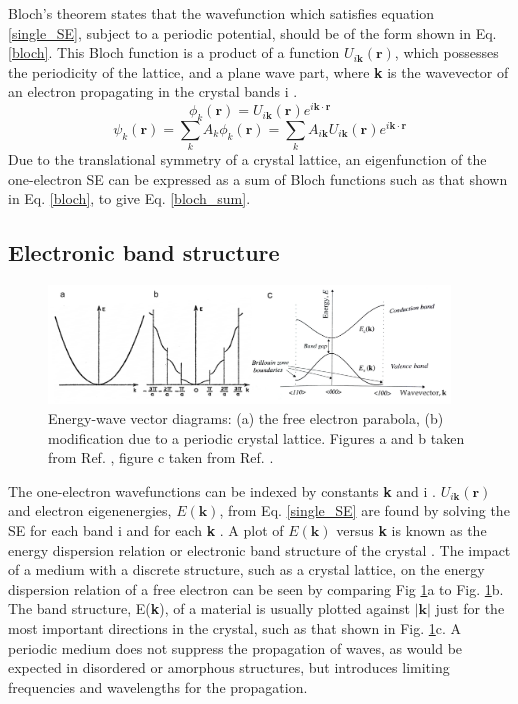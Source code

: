 \documentclass[11pt, twoside]{report}
\begin{document}
Bloch's theorem states that the wavefunction which satisfies equation \ref{single_SE}, subject to a periodic potential, should be of the form shown in Eq. \ref{bloch}. This Bloch function is a product of a function $U_{i\mathbf{k}}(\mathbf{r})$, which possesses the periodicity of the lattice, and a plane wave part, where \textbf{k} is the wavevector of an electron propagating in the crystal bands i \cite{Nelson3}.
\begin{equation} \label{bloch}
\phi_k(\mathbf{r}) = U_{i\mathbf{k}}(\mathbf{r}) e^{i\mathbf{k \cdot r}} 
\end{equation}
\begin{equation} \label{bloch_sum}
\psi_k(\mathbf{r}) = \sum_k A_k \phi_k(\mathbf{r}) = \sum_k A_{i\mathbf{k}}U_{i\mathbf{k}}(\mathbf{r}) e^{i\mathbf{k \cdot r}} 
\end{equation}
Due to the translational symmetry of a crystal lattice, an eigenfunction of the one-electron SE can be expressed as a sum of Bloch functions such as that shown in Eq. \ref{bloch}, to give Eq. \ref{bloch_sum}. 


\subsection{Electronic band structure}

\begin{figure}[h!]
  \centering
    \includegraphics[width=0.95\textwidth]{figures/bs1_2.png}
    \caption[Energy-wave vector diagrams: (a) the free electron parabola, (b) modification due to a periodic crystal lattice.]{Energy-wave vector diagrams: (a) the free electron parabola, (b) modification due to a periodic crystal lattice. Figures a and b taken from Ref. , figure c taken from Ref. .}
  \label{bs1}
\end{figure}
The one-electron wavefunctions can be indexed by constants \textbf{k} and i \cite{fund_semi}. 
$U_{i\mathbf{k}}(\mathbf{r})$ and electron eigenenergies, $E(\mathbf{k})$, from Eq. \ref{single_SE} are found by solving the SE for each band i and for each \textbf{k} \cite{Nelson3}.
A plot of $E(\textbf{k})$ versus \textbf{k} is known as the energy dispersion relation or electronic band structure of the crystal \cite{fund_semi}.
The impact of a medium with a discrete structure, such as a crystal lattice, on the energy dispersion relation of a free electron can be seen by comparing Fig \ref{bs1}a to Fig. \ref{bs1}b.
The band structure, E(\textbf{k}), of a material is usually plotted against $|\textbf{k}|$ just for the most important directions in the crystal, such as that shown in Fig. \ref{bs1}c. A periodic medium does not suppress the propagation of waves, as would be expected in disordered or amorphous structures, but introduces limiting frequencies and wavelengths for the propagation. 
\end{document}
